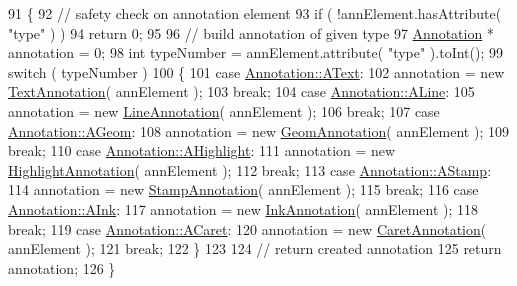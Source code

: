 \begin{DoxyCode}
91 \{
92     \textcolor{comment}{// safety check on annotation element}
93     \textcolor{keywordflow}{if} ( !annElement.hasAttribute( \textcolor{stringliteral}{"type"} ) )
94         \textcolor{keywordflow}{return} 0;
95 
96     \textcolor{comment}{// build annotation of given type}
97     \hyperlink{classOkular_1_1Annotation}{Annotation} * annotation = 0;
98     \textcolor{keywordtype}{int} typeNumber = annElement.attribute( \textcolor{stringliteral}{"type"} ).toInt();
99     \textcolor{keywordflow}{switch} ( typeNumber )
100     \{
101         \textcolor{keywordflow}{case} \hyperlink{classOkular_1_1Annotation_af71b46e37d5f850b97d5c4de3be9aac0a48f93d5a9352abc4e38a45f69075e504}{Annotation::AText}:
102             annotation = \textcolor{keyword}{new} \hyperlink{classOkular_1_1TextAnnotation}{TextAnnotation}( annElement );
103             \textcolor{keywordflow}{break};
104         \textcolor{keywordflow}{case} \hyperlink{classOkular_1_1Annotation_af71b46e37d5f850b97d5c4de3be9aac0a7035dc978d8b79958f34e3d164838726}{Annotation::ALine}:
105             annotation = \textcolor{keyword}{new} \hyperlink{classOkular_1_1LineAnnotation}{LineAnnotation}( annElement );
106             \textcolor{keywordflow}{break};
107         \textcolor{keywordflow}{case} \hyperlink{classOkular_1_1Annotation_af71b46e37d5f850b97d5c4de3be9aac0a2c11d328af34f5526fd9e761297fb3c2}{Annotation::AGeom}:
108             annotation = \textcolor{keyword}{new} \hyperlink{classOkular_1_1GeomAnnotation}{GeomAnnotation}( annElement );
109             \textcolor{keywordflow}{break};
110         \textcolor{keywordflow}{case} \hyperlink{classOkular_1_1Annotation_af71b46e37d5f850b97d5c4de3be9aac0a03e002f9ae62005b2d7c7f1445507501}{Annotation::AHighlight}:
111             annotation = \textcolor{keyword}{new} \hyperlink{classOkular_1_1HighlightAnnotation}{HighlightAnnotation}( annElement );
112             \textcolor{keywordflow}{break};
113         \textcolor{keywordflow}{case} \hyperlink{classOkular_1_1Annotation_af71b46e37d5f850b97d5c4de3be9aac0ad542ded420c9b01f44ee923bf28ecd9a}{Annotation::AStamp}:
114             annotation = \textcolor{keyword}{new} \hyperlink{classOkular_1_1StampAnnotation}{StampAnnotation}( annElement );
115             \textcolor{keywordflow}{break};
116         \textcolor{keywordflow}{case} \hyperlink{classOkular_1_1Annotation_af71b46e37d5f850b97d5c4de3be9aac0a4ed60063584ceb146c2a378f0df4ed37}{Annotation::AInk}:
117             annotation = \textcolor{keyword}{new} \hyperlink{classOkular_1_1InkAnnotation}{InkAnnotation}( annElement );
118             \textcolor{keywordflow}{break};
119         \textcolor{keywordflow}{case} \hyperlink{classOkular_1_1Annotation_af71b46e37d5f850b97d5c4de3be9aac0a904187454fd508d898a3d5843193ad43}{Annotation::ACaret}:
120             annotation = \textcolor{keyword}{new} \hyperlink{classOkular_1_1CaretAnnotation}{CaretAnnotation}( annElement );
121             \textcolor{keywordflow}{break};
122     \}
123 
124     \textcolor{comment}{// return created annotation}
125     \textcolor{keywordflow}{return} annotation;
126 \}
\end{DoxyCode}
